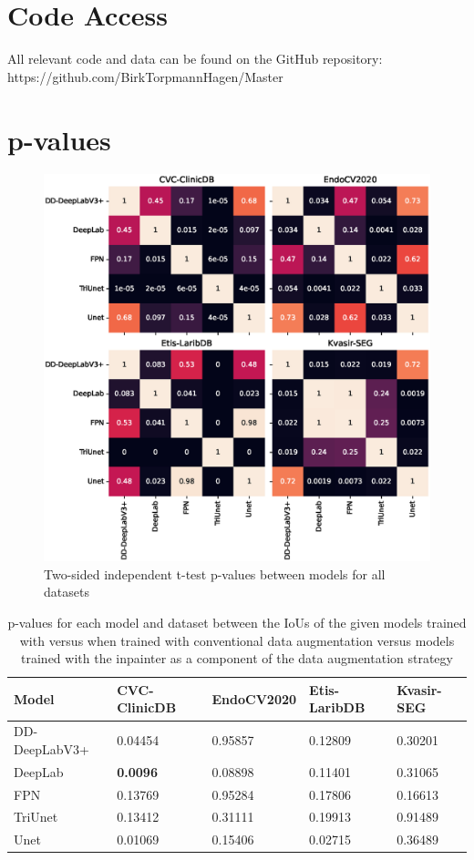 \appendix
\chapter{Code Access} \label{code_data}
All relevant code and data can be found on the GitHub repository: https://github.com/BirkTorpmannHagen/Master

\chapter{p-values}\label{p-values}

\begin{figure}[hbt]
    \centering
    \includegraphics[width=\linewidth]{illustrations/model_pvals.eps}
    \caption{Two-sided independent t-test p-values between models for all datasets}
    \label{models_pvalues}
\end{figure}
\begin{table}[htb]
    \centering
    \begin{tabularx}{\linewidth}{lXXXX}
    \toprule
     Model & CVC-ClinicDB & EndoCV2020 & Etis-LaribDB & Kvasir-SEG\\
    \midrule
    DD-DeepLabV3+ & 0.04454 & 0.95857 & 0.12809 & 0.30201\\ 
    DeepLab & \textbf{0.0096} & 0.08898 & 0.11401 & 0.31065\\ 
    FPN & 0.13769 & 0.95284 & 0.17806 & 0.16613\\ 
    TriUnet & 0.13412 & 0.31111 & 0.19913 & 0.91489\\ 
    Unet & 0.01069 & 0.15406 & 0.02715 & 0.36489\\ 
      \bottomrule
    \end{tabularx}
    \caption[T-test results inpainting]{p-values for each model and dataset between the IoUs of the given models trained with  versus when trained with conventional data augmentation versus models trained with the inpainter as a component of the data augmentation strategy}
    \label{tab:ttest_per_dataset_inpainter}
\end{table}
